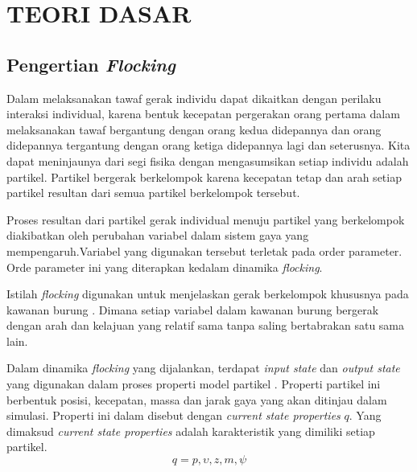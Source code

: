 %
%
%
\chapter{TEORI DASAR}\label{cha:teori}


\section{Pengertian \emph{Flocking}}\label{sec:pengertianflocking}
\hspace {0.5cm}Dalam melaksanakan tawaf gerak individu dapat dikaitkan dengan perilaku interaksi individual, karena bentuk kecepatan pergerakan orang pertama dalam melaksanakan tawaf bergantung dengan orang kedua didepannya dan orang didepannya tergantung dengan orang ketiga didepannya lagi dan seterusnya. Kita dapat meninjaunya dari segi fisika dengan mengasumsikan setiap individu adalah partikel. Partikel bergerak berkelompok karena kecepatan tetap dan arah setiap partikel resultan dari semua partikel berkelompok tersebut.

\hspace {0.5cm}Proses resultan dari partikel gerak individual menuju partikel yang berkelompok diakibatkan oleh perubahan variabel dalam sistem gaya yang mempengaruh.Variabel yang digunakan tersebut terletak pada order parameter. Orde parameter ini yang diterapkan kedalam dinamika \textit{flocking}.

\hspace {0.5cm}Istilah \emph{flocking} digunakan untuk menjelaskan gerak berkelompok khususnya pada kawanan burung \citep{Toner1998}. Dimana setiap variabel dalam kawanan burung bergerak dengan arah dan kelajuan yang relatif sama tanpa saling bertabrakan satu sama lain.



\hspace {0.5cm}Dalam dinamika \emph{flocking} yang dijalankan, terdapat \textit{input state} dan \textit{output state} yang digunakan dalam proses properti model partikel . Properti partikel ini berbentuk posisi, kecepatan, massa dan jarak gaya yang akan ditinjau dalam simulasi. Properti ini dalam \citep{Bajec2007} disebut dengan \textit{current state properties}  $q$. Yang dimaksud \textit{current state properties} adalah karakteristik yang dimiliki setiap partikel.
\begin{equation}
q = {p,\upsilon,z,m,\psi} 
\end{equation}




